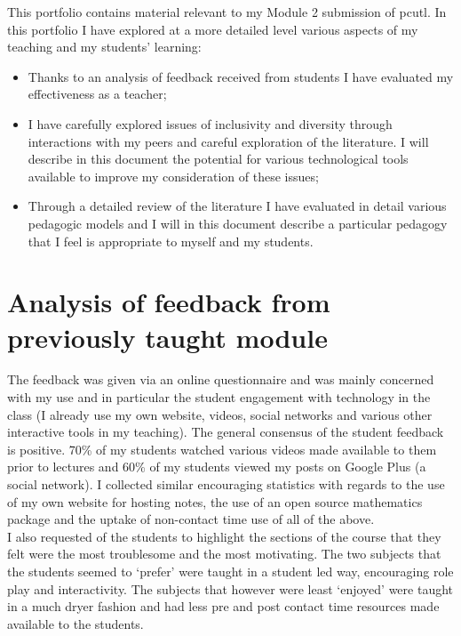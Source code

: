 \documentclass[a4paper,12pt]{article}
\begin{document}
This portfolio contains material relevant to my Module 2 submission of pcutl. In this portfolio I have explored at a more detailed level various aspects of my teaching and my students' learning:

\begin{itemize}
    \item Thanks to an analysis of feedback received from students I have evaluated my effectiveness as a teacher;
    \item I have carefully explored issues of inclusivity and diversity through interactions with my peers and careful exploration of the literature. I will describe in this document the potential for various technological tools available to improve my consideration of these issues;
    \item Through a detailed review of the literature I have evaluated in detail various pedagogic models and I will in this document describe a particular pedagogy that I feel is appropriate to myself and my students.
\end{itemize}

\section{Analysis of feedback from previously taught module}\label{Analysis}

The  feedback was given via an online questionnaire and was mainly concerned with my use and in particular the student engagement with technology in the class (I already use my own website, videos, social networks and various other interactive tools in my teaching). The general consensus of the student feedback is positive. 70\% of my students watched various videos made available to them prior to lectures and 60\% of my students viewed my posts on Google Plus (a social network). I collected similar encouraging statistics with regards to the use of my own website for hosting notes, the use of an open source mathematics package and the uptake of non-contact time use of all of the above.\\

I also requested of the students to highlight the sections of the course that they felt were the most troublesome and the most motivating. The two subjects that the students seemed to `prefer' were taught in a student led way, encouraging role play and interactivity. The subjects that however were least `enjoyed' were taught in a much dryer fashion and had less pre and post contact time resources made available to the students.\\
\end{document}
